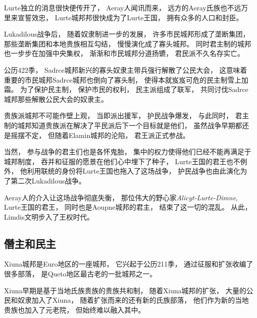 \documentclass[UTF8,12pt,draft]{ctexbook}
\begin{document}
            Lurte独立的消息很快便传开了，
            Aeray人闻讯而来，
            远方的Aeray氏族也不远万里来宣誓效忠，
            Lurte城邦邦很快成为了Lurte王国，
            拥有众多的人口和封臣。

            Lukadilous战争后，
            随着奴隶制进一步的发展，
            许多市民城邦形成了垄断集团，
            那些垄断集团和本地贵族相互勾结，
            慢慢演化成了寡头城邦。
            同时君主制的城邦也一步步在加强中央集权，
            渐渐和市民城邦分道扬镳，
            君民派不久名存实亡。

            公历422季，
            Sadrce城邦新兴的寡头奴隶主带兵强行解散了公民大会，
            这意味着重要的市民城邦Sadrce城邦也倒向了寡头制，
            使得本就岌岌可危的民主制雪上加霜。
            为了保护民主制，
            保护市民的权利，
            民主派组成了联军，
            共同讨伐Sadrce城邦那些解散公民大会的奴隶主。

            贵族派城邦不可能作壁上观，
            当即派出援军，
            护民战争爆发，
            与此同时，
            君主制的城邦知道贵族派在解决了平民派后下一个目标就是他们，
            虽然战争早期都还是摇摆不定，
            但随着Elamin城邦的沦陷，
            君王派正式参战。

            当然，
            参与战争的君主们也是各怀鬼胎，
            集中的权力使得他们已经不能再满足于城邦制度，
            吞并和征服的愿景在他们心中埋下了种子，
            Lurte王国的君王也不例外，
            他利用联统的身份将Lurte王国也拖入了这场战争，
            护民战争也由此演化为了第二次Lukadilous战争。

            Aeray人的介入让这场战争彻底失衡，
            那位伟大的野心家\emph{Alicyt-Lurte-Dimne},
            Lurte王国的君王，
            同时也是Aoupne城邦的君主，
            结束了这一切的混乱。
            从此，
            Limdis文明步入了王权时代。
            \subsection{僭主和民主}
                Xiuna城邦是Euro地区的一座城邦，
                它兴起于公历211季，
                通过征服和扩张收编了很多部落，
                是Queto地区最古老的一批城邦之一。

                Xiuna早期是基于当地氏族贵族的贵族共和制，
                随着Xiuna城邦的扩张，
                大量的公民和奴隶加入了Xiuna，
                随着扩张而来的还有新的氏族部落，
                他们作为新的当地贵族也加入了元老院，
                但始终难以融入其中。
\end{document}
